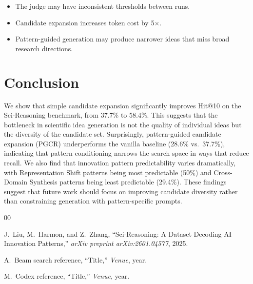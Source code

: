 \documentclass[conference]{IEEEtran}
\begin{document}
\begin{itemize}
    \item The judge may have inconsistent thresholds between runs.
    \item Candidate expansion increases token cost by 5$\times$.
    \item Pattern-guided generation may produce narrower ideas that miss broad research directions.
\end{itemize}

\section{Conclusion}

We show that simple candidate expansion significantly improves Hit@10 on the Sci-Reasoning benchmark, from 37.7\% to 58.4\%. This suggests that the bottleneck in scientific idea generation is not the quality of individual ideas but the diversity of the candidate set. Surprisingly, pattern-guided candidate expansion (PGCR) underperforms the vanilla baseline (28.6\% vs.\ 37.7\%), indicating that pattern conditioning narrows the search space in ways that reduce recall. We also find that innovation pattern predictability varies dramatically, with Representation Shift patterns being most predictable (50\%) and Cross-Domain Synthesis patterns being least predictable (29.4\%). These findings suggest that future work should focus on improving candidate diversity rather than constraining generation with pattern-specific prompts.

\begin{thebibliography}{00}

J.~Liu, M.~Harmon, and Z.~Zhang, ``Sci-Reasoning: A Dataset Decoding AI Innovation Patterns,'' \textit{arXiv preprint arXiv:2601.04577}, 2025.

A.~Beam search reference, ``Title,'' \textit{Venue}, year.

M.~Codex reference, ``Title,'' \textit{Venue}, year.

\end{thebibliography}
\end{document}
